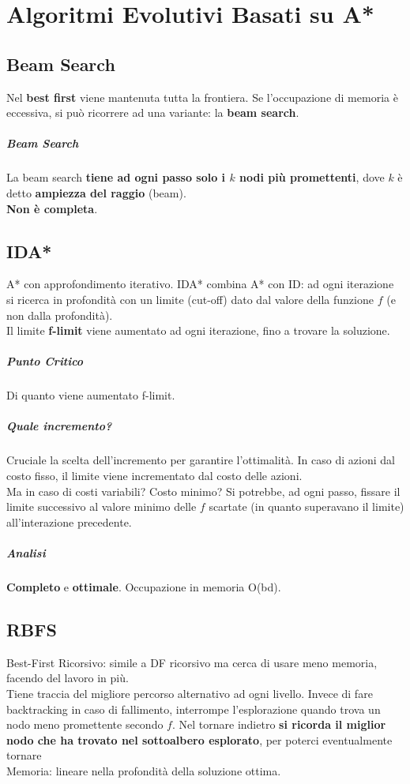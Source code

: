 \documentclass[10pt]{book}
\begin{document}
\chapter{Algoritmi Evolutivi Basati su A*}
\section{Beam Search}
Nel \textbf{best first} viene mantenuta tutta la frontiera. Se l'occupazione di memoria è eccessiva, si può ricorrere ad una variante: la \textbf{beam search}.
\paragraph{Beam Search} La beam search \textbf{tiene ad ogni passo solo i $k$ nodi più promettenti}, dove $k$ è detto \textbf{ampiezza del raggio} (beam).\\
\textbf{Non è completa}.
\section{IDA*}
A* con approfondimento iterativo. IDA* combina A* con ID: ad ogni iterazione si ricerca in profondità con un limite (cut-off) dato dal valore della funzione $f$ (e non dalla profondità).\\
Il limite \textbf{f-limit} viene aumentato ad ogni iterazione, fino a trovare la soluzione.
\paragraph{Punto Critico} Di quanto viene aumentato f-limit.
\paragraph{Quale incremento?} Cruciale la scelta dell'incremento per garantire l'ottimalità. In caso di azioni dal costo fisso, il limite viene incrementato dal costo delle azioni.\\
Ma in caso di costi variabili? Costo minimo? Si potrebbe, ad ogni passo, fissare il limite successivo al valore minimo delle $f$ scartate (in quanto superavano il limite) all'interazione precedente.
\paragraph{Analisi} \textbf{Completo} e \textbf{ottimale}. Occupazione in memoria O(bd).
\section{RBFS}
Best-First Ricorsivo: simile a DF ricorsivo ma cerca di usare meno memoria, facendo del lavoro in più.\\
Tiene traccia del migliore percorso alternativo ad ogni livello. Invece di fare backtracking in caso di fallimento, interrompe l’esplorazione quando trova un nodo meno promettente secondo $f$. Nel tornare indietro \textbf{si ricorda il miglior nodo che ha
trovato nel sottoalbero esplorato}, per poterci eventualmente tornare\\
Memoria: lineare nella profondità della soluzione ottima.
\end{document}
